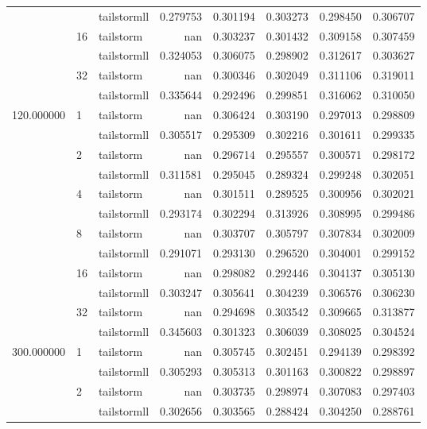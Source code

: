 \begin{tabular}{lllrrrrr}
 &  & tailstormll & 0.279753 & 0.301194 & 0.303273 & 0.298450 & 0.306707 \\
 & \multirow[c]{2}{*}{16} & tailstorm & nan & 0.303237 & 0.301432 & 0.309158 & 0.307459 \\
 &  & tailstormll & 0.324053 & 0.306075 & 0.298902 & 0.312617 & 0.303627 \\
 & \multirow[c]{2}{*}{32} & tailstorm & nan & 0.300346 & 0.302049 & 0.311106 & 0.319011 \\
 &  & tailstormll & 0.335644 & 0.292496 & 0.299851 & 0.316062 & 0.310050 \\
\multirow[c]{12}{*}{120.000000} & \multirow[c]{2}{*}{1} & tailstorm & nan & 0.306424 & 0.303190 & 0.297013 & 0.298809 \\
 &  & tailstormll & 0.305517 & 0.295309 & 0.302216 & 0.301611 & 0.299335 \\
 & \multirow[c]{2}{*}{2} & tailstorm & nan & 0.296714 & 0.295557 & 0.300571 & 0.298172 \\
 &  & tailstormll & 0.311581 & 0.295045 & 0.289324 & 0.299248 & 0.302051 \\
 & \multirow[c]{2}{*}{4} & tailstorm & nan & 0.301511 & 0.289525 & 0.300956 & 0.302021 \\
 &  & tailstormll & 0.293174 & 0.302294 & 0.313926 & 0.308995 & 0.299486 \\
 & \multirow[c]{2}{*}{8} & tailstorm & nan & 0.303707 & 0.305797 & 0.307834 & 0.302009 \\
 &  & tailstormll & 0.291071 & 0.293130 & 0.296520 & 0.304001 & 0.299152 \\
 & \multirow[c]{2}{*}{16} & tailstorm & nan & 0.298082 & 0.292446 & 0.304137 & 0.305130 \\
 &  & tailstormll & 0.303247 & 0.305641 & 0.304239 & 0.306576 & 0.306230 \\
 & \multirow[c]{2}{*}{32} & tailstorm & nan & 0.294698 & 0.303542 & 0.309665 & 0.313877 \\
 &  & tailstormll & 0.345603 & 0.301323 & 0.306039 & 0.308025 & 0.304524 \\
\multirow[c]{12}{*}{300.000000} & \multirow[c]{2}{*}{1} & tailstorm & nan & 0.305745 & 0.302451 & 0.294139 & 0.298392 \\
 &  & tailstormll & 0.305293 & 0.305313 & 0.301163 & 0.300822 & 0.298897 \\
 & \multirow[c]{2}{*}{2} & tailstorm & nan & 0.303735 & 0.298974 & 0.307083 & 0.297403 \\
 &  & tailstormll & 0.302656 & 0.303565 & 0.288424 & 0.304250 & 0.288761 \\

\end{tabular}
